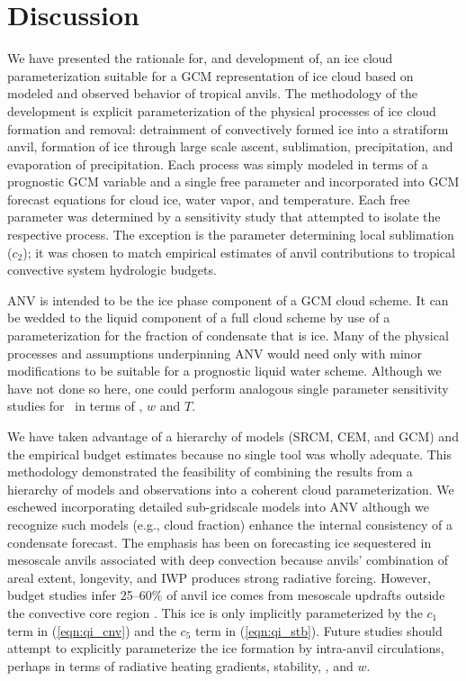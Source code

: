 \documentclass[twoside,agums]{aguplus}
\begin{document}
\section{Discussion}\label{sec:cem_disc}

We have presented the rationale for, and development of, an ice cloud
parameterization suitable for a GCM representation of ice cloud
based on modeled and observed behavior of tropical anvils.
The methodology of the development is explicit parameterization of the
physical processes of ice cloud formation and removal: detrainment of 
convectively formed ice into a stratiform anvil, formation of ice
through large scale ascent, sublimation, precipitation, and
evaporation of precipitation.
Each process was simply modeled in terms of a prognostic GCM variable
and a single free parameter and incorporated into GCM forecast equations
for cloud ice, water vapor, and temperature.  
Each free parameter was determined by a sensitivity study that
attempted to isolate the respective process.
The exception is the parameter determining local sublimation ($c_2$);
it was chosen to match empirical estimates of anvil contributions to
tropical convective system hydrologic budgets. 

ANV is intended to be the ice phase component of a GCM cloud scheme. 
It can be wedded to the liquid component of a full cloud scheme by use 
of a parameterization for the fraction of condensate that is ice.
Many of the physical processes and assumptions underpinning ANV would 
need only with minor modifications to be suitable for a prognostic
liquid water scheme.
Although we have not done so here, one could perform analogous
single parameter sensitivity studies for \qldot\ in terms of \Mc, $w$
and $T$.

We have taken advantage of a hierarchy of models (SRCM, CEM, and GCM)
and the empirical budget estimates because no single tool was wholly
adequate. 
This methodology demonstrated the feasibility of combining the results 
from a hierarchy of models and observations into a coherent cloud
parameterization.
We eschewed incorporating detailed sub-gridscale models into ANV
although we recognize such models (e.g., cloud fraction) enhance the
internal consistency of a condensate forecast. 
The emphasis has been on forecasting ice sequestered in mesoscale
anvils associated with deep convection because anvils'
combination of areal extent, longevity, and IWP produces strong
radiative forcing.
However, budget studies infer 25--60\% of anvil ice comes from
mesoscale updrafts outside the convective core region
\cite[]{LeH80,GaJ91}. 
This ice is only implicitly parameterized by the $c_1$ term in
(\ref{eqn:qi_cnv}) and the $c_5$ term in (\ref{eqn:qi_stb}).  
Future studies should attempt to explicitly parameterize the ice
formation by intra-anvil circulations, perhaps in terms of radiative
heating gradients, stability, \qi, and $w$.
\end{document}
